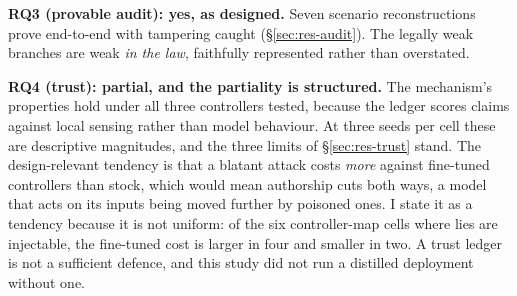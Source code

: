 \textbf{RQ3 (provable audit): yes, as designed.} Seven scenario
reconstructions prove end-to-end with tampering caught
(\S\ref{sec:res-audit}). The legally weak branches are weak \emph{in the
law}, faithfully represented rather than overstated.

\textbf{RQ4 (trust): partial, and the partiality is structured.} The
mechanism's properties hold under all three controllers tested, because
the ledger scores claims against local sensing rather than model
behaviour. At three seeds per cell these are descriptive magnitudes, and
the three limits of \S\ref{sec:res-trust} stand. The design-relevant tendency is that a blatant attack
costs \emph{more} against fine-tuned controllers than stock, which would
mean authorship cuts both ways, a model that acts on its inputs
being moved further by poisoned ones. I state it as a tendency because it
is not uniform: of the six controller-map cells where lies are injectable,
the fine-tuned cost is larger in four and smaller in two. A trust ledger
is not a sufficient defence, and this study did not run a distilled
deployment without one.
